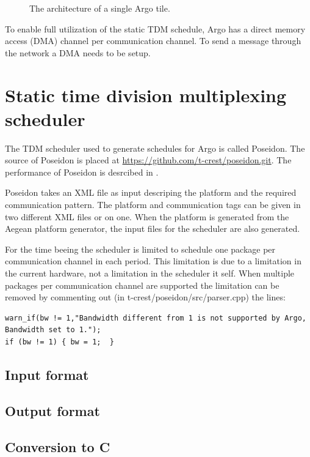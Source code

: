 \documentclass[a4paper,fontsize=10pt,twoside,DIV15,BCOR12mm,headinclude=true,footinclude=false,pagesize,bibtotoc]{scrbook}
\begin{document}
\begin{figure}
\centering
\caption{The architecture of a single Argo tile.}
\label{fig:diag}
\end{figure}

To enable full utilization of the static TDM schedule,
Argo has a direct memory access (DMA) channel per communication channel.
To send a message through the network a DMA needs to be setup.


\chapter{Static time division multiplexing scheduler}
\label{chap:poseidon}
The TDM scheduler used to generate schedules for Argo is called Poseidon.
The source of Poseidon is placed at \url{https://github.com/t-crest/poseidon.git}.
The performance of Poseidon is desrcibed in \cite{tcrest:poseidon}.%

Poseidon takes an XML file as input descriping the platform and the required communication pattern.
The platform and communication tags can be given in two different XML files or on one.
When the platform is generated from the Aegean platform generator, the input files for the scheduler are also generated.

For the time beeing the scheduler is limited to schedule one package per communication channel in each period.
This limitation is due to a limitation in the current hardware, not a limitation in the scheduler it self.
When multiple packages per communication channel are supported the limitation can be removed by commenting out (in t-crest/poseidon/src/parser.cpp) the lines:

\begin{verbatim}
warn_if(bw != 1,"Bandwidth different from 1 is not supported by Argo, Bandwidth set to 1.");
if (bw != 1) { bw = 1;  }
\end{verbatim}

\section{Input format}

\section{Output format}

\section{Conversion to C}
\end{document}
